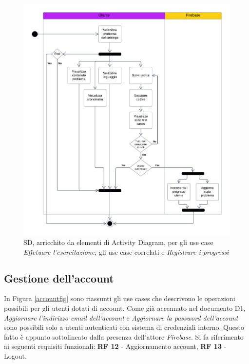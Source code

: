 \documentclass[11pt, a4paper]{article}
\theoremstyle{definition} %
\begin{document}
\begin{figure}[H]
\centering
\hspace*{-0.4cm}
\includegraphics[scale=0.57]{materiale/ucdiagrams/sldesercitazione.pdf}
\caption{SD, arricchito da elementi di Activity Diagram,
per gli use case \textit{Effetuare l'esercitazione}, gli use case correlati
e \textit{Registrare i progressi}}
\label{acexercise}
\end{figure}


\newpage
\subsection{Gestione dell'account}
In Figura \ref{accountfig} sono riassunti gli use cases che descrivono
le operazioni possibili per gli utenti dotati di account. Come già accennato
nel documento D1, \textit{Aggiornare l'indirizzo email dell'account} e
\textit{Aggiornare la password dell'account} sono possibili solo a utenti
autenticati con sistema di credenziali interno. Questo fatto è appunto
sottolineato dalla presenza dell'attore \textit{Firebase}. Si fa riferimento
ai seguenti requisiti funzionali:
\textbf{RF 12} - Aggiornamento account, \textbf{RF 13} - Logout.
\end{document}

